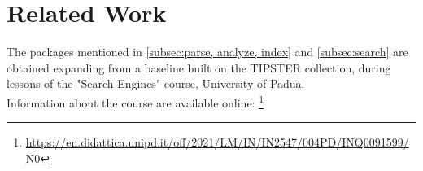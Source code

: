 \section{Related Work}
\label{sec:related work}

The packages mentioned in \ref{subsec:parse, analyze, index} and \ref{subsec:search} are obtained expanding from a baseline built on the TIPSTER collection, during lessons of the "Search Engines" course, University of Padua.\\ Information about the course are available online:
\footnote{\url{https://en.didattica.unipd.it/off/2021/LM/IN/IN2547/004PD/INQ0091599/N0}}